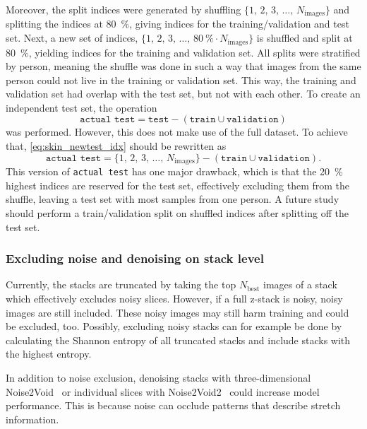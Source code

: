 Moreover, the split indices were generated by shuffling $\{1,\, 2,\, 3,\, \ldots,\, N_\mathrm{images}\}$ and splitting the indices at \qty{80}{\percent}, giving indices for the training/validation and test set.
Next, a new set of indices, $\{1,\, 2,\, 3,\, \ldots,\, \qty{80}{\percent} \cdot N_\mathrm{images}\}$ is shuffled and split at \qty{80}{\percent}, yielding indices for the training and validation set.
All splits were stratified by person, meaning the shuffle was done in such a way that images from the same person could not live in the training or validation set.
This way, the training and validation set had overlap with the test set, but not with each other.
To create an independent test set, the operation
\begin{equation}\label{eq:skin_newtest_idx}
    \texttt{actual test} = \texttt{test} - (\texttt{train} \cup \texttt{validation})
\end{equation}
was performed.
However, this does not make use of the full dataset.
To achieve that, \cref{eq:skin_newtest_idx} should be rewritten as
\begin{equation}
    \texttt{actual test} = \{1,\, 2,\, 3,\, \ldots,\, N_\mathrm{images}\} - (\texttt{train} \cup \texttt{validation}).
\end{equation}
This version of \texttt{actual test} has one major drawback, which is that the \qty{20}{\percent} highest indices are reserved for the test set, effectively excluding them from the shuffle, leaving a test set with most samples from one person.
A future study should perform a train/validation split on shuffled indices after splitting off the test set.

\subsubsection{Excluding noise and denoising on stack level}
Currently, the stacks are truncated by taking the top $N_\mathrm{best}$ images of a stack which effectively excludes noisy slices.
However, if a full z-stack is noisy, noisy images are still included.
These noisy images may still harm training and could be excluded, too.
Possibly, excluding noisy stacks can for example be done by calculating the Shannon entropy of all truncated stacks and include stacks with the highest entropy.

In addition to noise exclusion, denoising stacks with three-dimensional Noise2Void~ or individual slices with Noise2Void2~ could increase model performance.
This is because noise can occlude patterns that describe stretch information.

